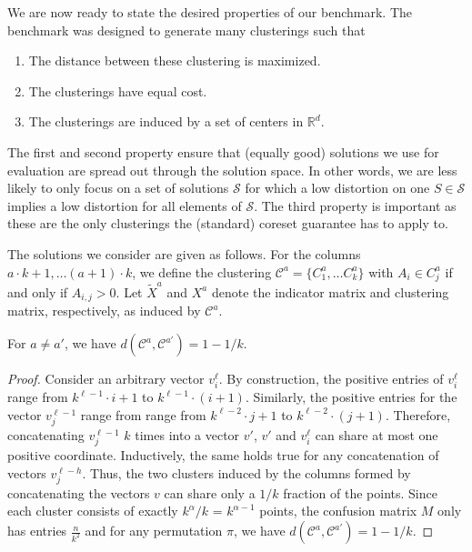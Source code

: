 We are now ready to state the desired properties of our benchmark. The benchmark was designed to generate many clusterings such that
\begin{enumerate}
\item The distance between these clustering is maximized.
\item The clusterings have equal cost.
\item The clusterings are induced by a set of centers in $\mathbb{R}^d$.
\end{enumerate}

The first and second property ensure that (equally good) solutions we use for evaluation are spread out through the solution space. In other words, we are less likely to only focus on a set of solutions $\mathcal{S}$ for which a low distortion on one $S\in\mathcal{S}$ implies a low distortion for all elements of $\mathcal{S}$.
The third property is important as these are the only clusterings the (standard) coreset guarantee has to apply to. 


The solutions we consider are given as follows. For the columns $a\cdot k+1,\ldots (a+1)\cdot k$, we define the clustering $\mathcal{C}^{a} = \{C_1^a,\ldots C_k^a\}$ with 
$A_i\in C_j^a$ if and only if $A_{i,j} > 0$. Let $\tilde X^a$ and $X^{a}$ denote the indicator matrix and clustering matrix, respectively, as induced by $\mathcal{C}^{a}$.


\begin{fact}
For $a\neq a'$, we have $d(\mathcal{C}^{a},\mathcal{C}^{a'}) = 1-1/k$.
\end{fact}
\begin{proof}
Consider an arbitrary vector $v_i^{\ell}$. By construction, the positive entries of $v_i^{\ell}$ range from $k^{\ell-1}\cdot i+1$ to $k^{\ell-1}\cdot (i+1)$. Similarly, the positive entries for the vector $v_j^{\ell-1}$ range from range from $k^{\ell-2}\cdot j+1$ to $k^{\ell-2}\cdot (j+1)$. Therefore, concatenating $v_j^{\ell-1}$ $k$ times into a vector $v'$, $v'$ and $v_i^{\ell}$ can share at most one positive coordinate. Inductively, the same holds true for any concatenation of vectors $v_j^{\ell-h}$.
Thus, the two clusters induced by the columns formed by concatenating the vectors $v$ can share only a $1/k$ fraction of the points. Since each cluster consists of exactly $k^{\alpha}/k$ = $k^{\alpha-1}$ points, the confusion matrix $M$ only has entries $\frac{n}{k^2}$ and for any permutation $\pi$, we have $d(\mathcal{C}^{a},\mathcal{C}^{a'}) = 1-1/k$.
\end{proof}

